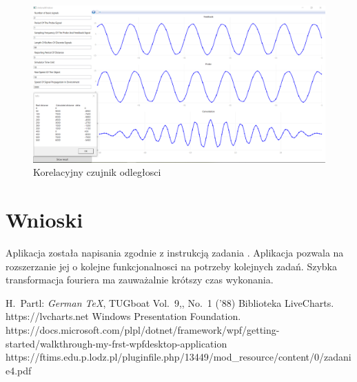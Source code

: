 \documentclass[12pt]{article}
\begin{document}
\begin{figure}[H]
 \centering
 \includegraphics[width=14cm]{images/a3.PNG}
 \vspace{-0.3cm}
 \caption{Korelacyjny czujnik odległosci}
 \label{gui}
\end{figure}


\newpage

\section{Wnioski}

Aplikacja została napisania zgodnie z instrukcją zadania \cite{zad}. Aplikacja pozwala na rozszerzanie jej o kolejne funkcjonalnosci na potrzeby kolejnych zadań.
Szybka transformacja fouriera ma zauważalnie krótszy czas wykonania.





\begin{thebibliography}{99}
 H.~Partl:
\emph{German \TeX},
TUGboat Vol.~9,, No.~1 ('88)
 Biblioteka LiveCharts. https://lvcharts.net
 Windows Presentation Foundation. https://docs.microsoft.com/plpl/dotnet/framework/wpf/getting-started/walkthrough-my-frst-wpfdesktop-application
 https://ftims.edu.p.lodz.pl/pluginfile.php/13449/mod\_resource/content/0/zadanie4.pdf
\end{thebibliography}
\end{document}
